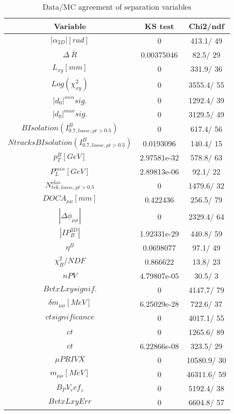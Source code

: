 \documentclass{article}
\begin{document}
\begin{table}[htbp]
\caption{\label{tab:sepVars}Data/MC agreement of separation variables}
\begin{center}
\begin{tabular}{c|c|c}
Variable & KS test & Chi2/ndf \\
\hline
$|\alpha_{2D}| [rad]$ & 0 & 413.1/ 49\\
\hline
$\Delta~R$ & 0.00375046 &  82.5/ 29\\
\hline
$L_{xy} [mm]$ & 0 & 331.9/ 36\\
\hline
$Log(\chi^{2}_{xy})$ & 0 & 3555.4/ 55\\
\hline
$|d_{0}|^{min} sig.$ & 0 & 1292.4/ 39\\
\hline
$|d_{0}|^{max} sig.$ & 0 & 3129.5/ 49\\
\hline
$B Isolation (I^{B}_{0.7, loose, pt>0.5})$ & 0 & 617.4/ 56\\
\hline
$Ntracks B Isolation (I^{B}_{0.7, loose, pt>0.5})$ & 0.0193096 & 140.4/ 15\\
\hline
$p_{T}^{B} [GeV]$ & 2.97581e-32 & 578.8/ 63\\
\hline
$P^{min}_{L} [GeV]$ & 2.89813e-06 &  92.1/ 22\\
\hline
$N^{clos}_{trk, loose, pt>0.5}$ & 0 & 1479.6/ 32\\
\hline
$DOCA_{\mu\mu} [mm]$ & 0.422436 & 256.5/ 79\\
\hline
$|\Delta\phi_{\mu\mu}|$ & 0 & 2329.4/ 64\\
\hline
$|IP_{B}^{3D}|$ & 1.92331e-29 & 440.8/ 59\\
\hline
$\eta^{B}$ & 0.0698077 &  97.1/ 49\\
\hline
$\chi^{2}_{B}/NDF$ & 0.866622 &  13.8/ 23\\
\hline
$nPV$ & 4.79807e-05 &  30.5/  3\\
\hline
$BvtxLxy signif.$ & 0 & 4147.7/ 79\\
\hline
$\delta m_{\mu\mu} [MeV]$ & 6.25029e-28 & 722.6/ 37\\
\hline
$ct significance$ & 0 & 4017.1/ 55\\
\hline
$ct$ & 0 & 1265.6/ 89\\
\hline
$ct$ & 6.22866e-08 & 323.5/ 29\\
\hline
$\mu PRIVX$ & 0 & 10580.9/ 30\\
\hline
$m_{\mu\mu} [MeV]$ & 0 & 46311.6/ 59\\
\hline
$B_PV_ref_z$ & 0 & 5192.4/ 38\\
\hline
$BvtxLxyErr$ & 0 & 6604.8/ 57\\

\end{tabular}
\end{center}
\end{table}
\end{document}
